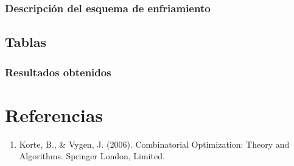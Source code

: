 \documentclass{article}
\begin{document}
\subsubsection*{Descripción del esquema de enfriamiento}

\subsection*{Tablas}

\subsubsection*{Resultados obtenidos}

\newpage
\section*{Referencias}
\begin{enumerate}
	\item Korte, B., \& Vygen, J. (2006). Combinatorial Optimization: Theory and Algorithms. Springer London, Limited.
\end{enumerate}
\end{document}
